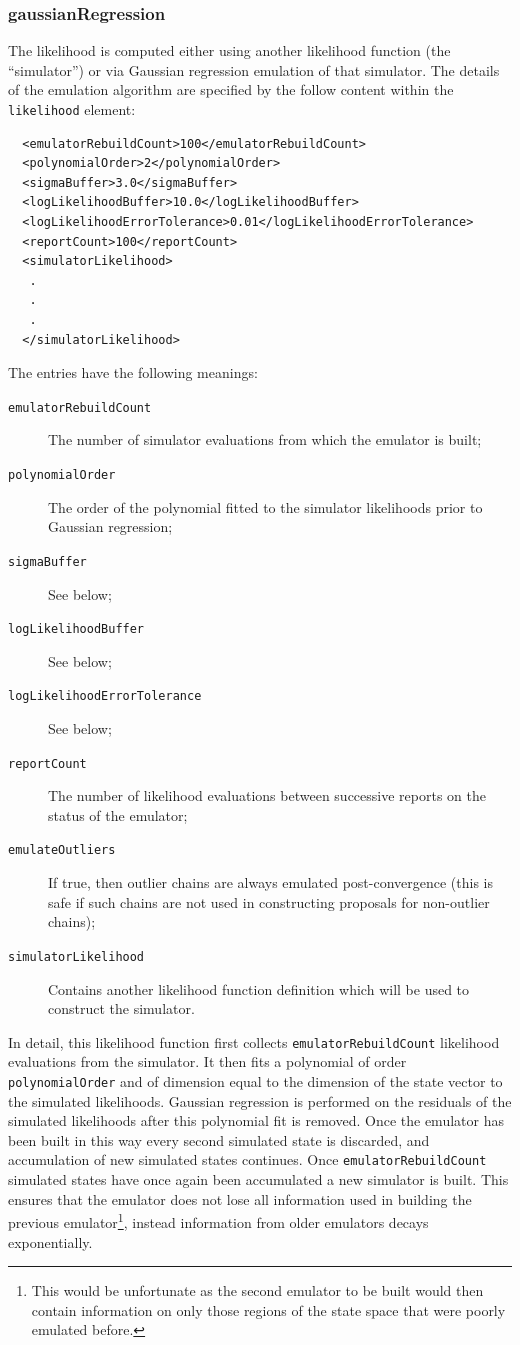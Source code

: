 \subsubsection{gaussianRegression}

The likelihood is computed either using another likelihood function (the ``simulator'') or via Gaussian regression emulation of that simulator. The details of the emulation algorithm are specified by the follow content within the {\tt likelihood} element:
\begin{verbatim}
  <emulatorRebuildCount>100</emulatorRebuildCount>
  <polynomialOrder>2</polynomialOrder>
  <sigmaBuffer>3.0</sigmaBuffer>
  <logLikelihoodBuffer>10.0</logLikelihoodBuffer>
  <logLikelihoodErrorTolerance>0.01</logLikelihoodErrorTolerance>
  <reportCount>100</reportCount>
  <simulatorLikelihood>
   .
   .
   .
  </simulatorLikelihood>
\end{verbatim}

The entries have the following meanings:
\begin{description}
\item[{\tt emulatorRebuildCount}] The number of simulator evaluations from which the emulator is built;
\item[{\tt polynomialOrder}] The order of the polynomial fitted to the simulator likelihoods prior to Gaussian regression;
\item[{\tt sigmaBuffer}] See below;
\item[{\tt logLikelihoodBuffer}] See below;
\item[{\tt logLikelihoodErrorTolerance}] See below;
\item[{\tt reportCount}] The number of likelihood evaluations between successive reports on the status of the emulator;
\item[{\tt emulateOutliers}] If true, then outlier chains are always emulated post-convergence (this is safe if such chains are not used in constructing proposals for non-outlier chains);
\item[{\tt simulatorLikelihood}] Contains another likelihood function definition which will be used to construct the simulator.
\end{description}

In detail, this likelihood function first collects {\tt emulatorRebuildCount} likelihood evaluations from the simulator. It then fits a polynomial of order {\tt polynomialOrder} and of dimension equal to the dimension of the state vector to the simulated likelihoods. Gaussian regression is performed on the residuals of the simulated likelihoods after this polynomial fit is removed. Once the emulator has been built in this way every second simulated state is discarded, and accumulation of new simulated states continues. Once {\tt emulatorRebuildCount} simulated states have once again been accumulated a new simulator is built. This ensures that the emulator does not lose all information used in building the previous emulator\footnote{This would be unfortunate as the second emulator to be built would then contain information on only those regions of the state space that were poorly emulated before.}, instead information from older emulators decays exponentially.

